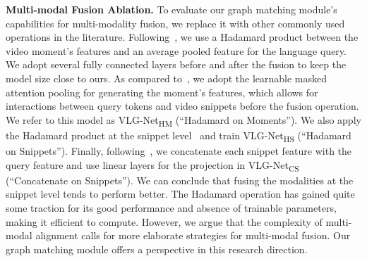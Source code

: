 \documentclass[10pt,twocolumn,letterpaper]{article}
\begin{document}
\begin{table*}[!ht]
    \centering \setlength{\tabcolsep}{2pt}
\renewcommand{\arraystretch}{1.1} 
\vspace{.1cm}
\caption{\label{tab:ablation}{\bf Ablation on context modelling and multi-modal fusion approaches.} This ablation shows how the pipeline takes advantage of context modelling and our graph matching module to achieving state-of-the-art performance.}
     \vspace{-0.2cm}
\end{table*}

\noindent\textbf{Multi-modal Fusion Ablation.} To evaluate our graph matching module's capabilities for multi-modality fusion, we replace it with other commonly used operations in the literature. Following~\cite{2DTAN_2020_AAAI}, we use a Hadamard product between the video moment's features and an average pooled feature for the language query. We adopt several fully connected layers before and after the fusion to keep the model size close to ours. As compared to~\cite{2DTAN_2020_AAAI}, we adopt the learnable masked attention pooling for generating the moment's features, which allows for interactions between query tokens and video snippets before the fusion operation. We refer to this model as VLG-Net\textsubscript{HM} (``Hadamard on Moments'').
We also apply the Hadamard product at the snippet level~\cite{Mun_2020_CVPR,Rodriguez_2020_WACV,Zeng_2020_CVPR} and train VLG-Net\textsubscript{HS} (``Hadamard on Snippets''). Finally, following~\cite{chen_etal_2018_temporally,chenhierarchical,wang2020temporally}, we concatenate each snippet feature with the query feature and use linear layers for the projection in VLG-Net\textsubscript{CS} (``Concatenate on Snippets''). 
We can conclude that fusing the modalities at the snippet level tends to perform better. The Hadamard operation has gained quite some traction for its good performance and absence of trainable parameters, making it efficient to compute. However, we argue that the complexity of multi-modal alignment calls for more elaborate strategies for multi-modal fusion. Our graph matching module offers a perspective in this research direction. 
\end{document}

